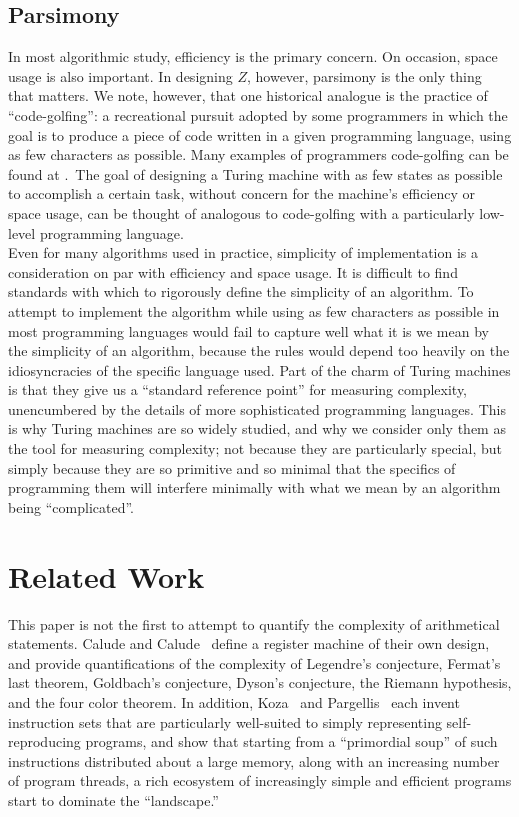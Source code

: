 \documentclass[11pt]{article}
\begin{document}
\subsection{Parsimony}

In most algorithmic study, efficiency is the primary concern. On occasion, space usage is also important. In designing $Z$, however, parsimony is the only thing that matters. We note, however, that one historical analogue is the practice of ``code-golfing'': a recreational pursuit adopted by some programmers in which the goal is to produce a piece of code written in a given programming language, using as few characters as possible. Many examples of programmers code-golfing can be found at \cite{codegolf}.~The goal of designing a Turing machine with as few states as possible to accomplish a certain task, without concern for the machine's efficiency or space usage, can be thought of analogous to code-golfing with a particularly low-level programming language. \\

Even for many algorithms used in practice, simplicity of implementation is a consideration on par with efficiency and space usage. It is difficult to find standards with which to rigorously define the simplicity of an algorithm. To attempt to implement the algorithm while using as few characters as possible in most programming languages would fail to capture well what it is we mean by the simplicity of an algorithm, because the rules would depend too heavily on the idiosyncracies of the specific language used. Part of the charm of Turing machines is that they give us a ``standard reference point'' for measuring complexity, unencumbered by the details of more sophisticated programming languages. This is why Turing machines are so widely studied, and why we consider only them as the tool for measuring complexity; not because they are particularly special, but simply because they are so primitive and so minimal that the specifics of programming them will interfere minimally with what we mean by an algorithm being ``complicated''.

\section{Related Work}

This paper is not the first to attempt to quantify the complexity of arithmetical statements. Calude and Calude~\cite{calude} define a register machine of their own design, and provide quantifications of the complexity of Legendre's conjecture, Fermat's last theorem, Goldbach's conjecture, Dyson's conjecture, the Riemann hypothesis, and the four color theorem. In addition, Koza~\cite{koza} and Pargellis~\cite{pargellis} each invent instruction sets that are particularly well-suited to simply representing self-reproducing programs, and show that starting from a ``primordial soup'' of such instructions distributed about a large memory, along with an increasing number of program threads, a rich ecosystem of increasingly simple and efficient programs start to dominate the ``landscape.'' \\
\end{document}
